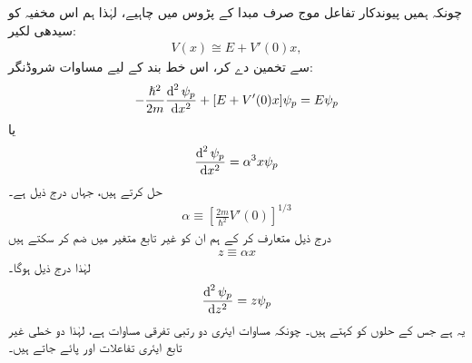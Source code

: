 چونکہ ہمیں پیوندکار تفاعل موج  صرف مبدا کے پڑوس میں چاہیے، لہٰذا ہم اس مخفیہ کو سیدھی لکیر: 
\begin{align}\label{مساوات_وقب_خط_بند_مخفیہ}
	V(x) \cong E + V'(0)x,
\end{align}
سے تخمین دے کر، اس خط بند  کے لیے مساوات شروڈنگر:
\begin{align*}
	-\frac{\hslash^{2}}{2m} \frac{\dif^{\,2}\psi_{p}}{\dif x^{2}} +[E+V'(0)x]\psi_{p}=E\psi_{p}
\end{align*}
یا 
\begin{align}
	\frac{\dif^{\,2} \psi_{p}}{\dif x^{2}} = \alpha^{3} x\psi_{p}
\end{align}
 حل کرتے ہیں، جہاں درج ذیل ہے۔
\begin{align}\label{مساوات_وقب_خط_بند_اور_مستقل}
	\alpha\equiv\left[\frac{2m}{\hslash^{2}} V'(0)\right]^{1/3}
\end{align}
درج ذیل متعارف کر کے ہم ان  کو غیر تابع متغیر میں ضم کر سکتے ہیں
\begin{align}
	z\equiv\alpha x
\end{align}
لہٰذا درج ذیل ہوگا۔
\begin{align}
	\frac{\dif^{\,2}\psi_{p}}{\dif z^{2}}=z\psi_{p}
\end{align}
یہ  ہے جس کے حلوں کو  کہتے ہیں۔  چونکہ مساوات ایئری دو رتبی تفرقی مساوات ہے، لہٰذا دو خطی غیر تابع ایئری تفاعلات  اور  پائے جاتے ہیں۔

